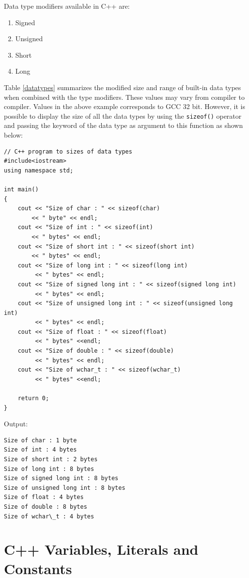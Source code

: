 \documentclass{book}
\begin{document}
Data type modifiers available in C++ are:

\begin{enumerate}
	\item Signed
\item Unsigned
\item Short
\item Long
\end{enumerate}

Table \ref{datatypes} summarizes the modified size and range of built-in data types when combined with the type modifiers. These values may vary from compiler to compiler. Values in the above example corresponds to GCC 32 bit. However, it is possible to display the size of all the data types by using the \texttt{sizeof()} operator and passing the keyword of the data type as argument to this function as shown below: 

\begin{lstlisting}
// C++ program to sizes of data types
#include<iostream>
using namespace std;
 
int main()
{
	cout << "Size of char : " << sizeof(char)
		<< " byte" << endl;
	cout << "Size of int : " << sizeof(int)
		<< " bytes" << endl;
	cout << "Size of short int : " << sizeof(short int)
		<< " bytes" << endl;
	cout << "Size of long int : " << sizeof(long int)
		 << " bytes" << endl;
	cout << "Size of signed long int : " << sizeof(signed long int)
		 << " bytes" << endl;
	cout << "Size of unsigned long int : " << sizeof(unsigned long int)
		 << " bytes" << endl;
	cout << "Size of float : " << sizeof(float)
		 << " bytes" <<endl;
	cout << "Size of double : " << sizeof(double)
		 << " bytes" << endl;
	cout << "Size of wchar_t : " << sizeof(wchar_t)
		 << " bytes" <<endl;
	 
	return 0;
}
\end{lstlisting}

Output: 

\begin{lstlisting}
Size of char : 1 byte
Size of int : 4 bytes
Size of short int : 2 bytes
Size of long int : 8 bytes
Size of signed long int : 8 bytes
Size of unsigned long int : 8 bytes
Size of float : 4 bytes
Size of double : 8 bytes
Size of wchar\_t : 4 bytes
\end{lstlisting}

\section{C++ Variables, Literals and Constants}
\end{document}
